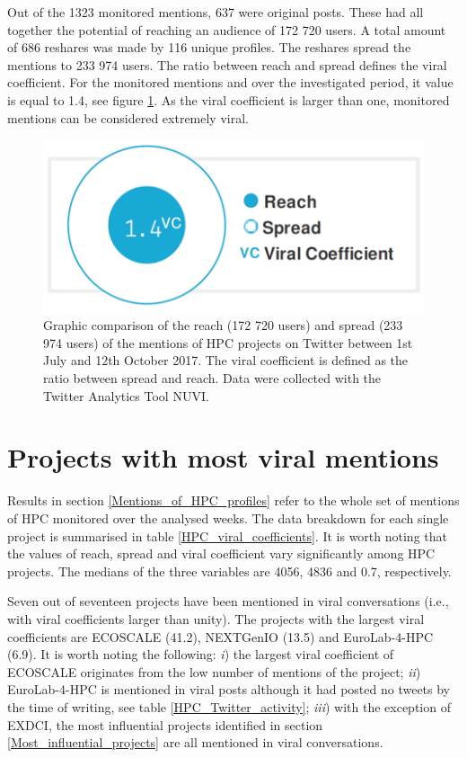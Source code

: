 Out of the 1323 monitored mentions, 637 were original posts. These had all together the potential of reaching an audience of 172 720 users. A total amount of 686 reshares was made by 116 unique profiles. The reshares spread the mentions to 233 974 users. The ratio between reach and spread defines the viral coefficient. For the monitored mentions and over the investigated period, it value is equal to 1.4, see figure \ref{HPC_viral_coefficient}. As the viral coefficient is larger than one, monitored mentions can be considered extremely viral. 

\begin{figure}[H] 
 \begin{center}
 \includegraphics[scale=0.2]{Images/HPC_viral_coefficient.png}
 \caption{Graphic comparison of the reach (172 720 users) and spread (233 974 users) of the mentions of HPC projects on Twitter between 1st July and 12th October 2017. The viral coefficient is defined as the ratio between spread and reach. Data were collected with the Twitter Analytics Tool NUVI.}
 \label{HPC_viral_coefficient}
 \end{center}
\end{figure}

\section{Projects with most viral mentions}
Results in section \ref{Mentions_of_HPC_profiles} refer to the whole set of mentions of HPC monitored over the analysed weeks. The data breakdown for each single project is summarised in table \ref{HPC_viral_coefficients}. It is worth noting that the values of reach, spread and viral coefficient vary significantly among HPC projects. The medians of the three variables are 4056, 4836 and 0.7, respectively.      

Seven out of seventeen projects have been mentioned in viral conversations (i.e., with viral coefficients larger than unity). The projects with the largest viral coefficients are ECOSCALE (41.2), NEXTGenIO (13.5) and EuroLab-4-HPC (6.9). It is worth noting the following: \textit{i}) the largest viral coefficient of ECOSCALE originates from the low number of mentions of the project; \textit{ii}) EuroLab-4-HPC is mentioned in viral posts although it had posted no tweets by the time of writing, see table \ref{HPC_Twitter_activity}; \textit{iii}) with the exception of EXDCI, the most influential projects identified in section \ref{Most_influential_projects} are all mentioned in viral conversations.

